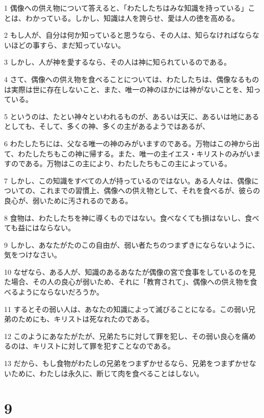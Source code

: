 \par 1 偶像への供え物について答えると、「わたしたちはみな知識を持っている」ことは、わかっている。しかし、知識は人を誇らせ、愛は人の徳を高める。
\par 2 もし人が、自分は何か知っていると思うなら、その人は、知らなければならないほどの事すら、まだ知っていない。
\par 3 しかし、人が神を愛するなら、その人は神に知られているのである。
\par 4 さて、偶像への供え物を食べることについては、わたしたちは、偶像なるものは実際は世に存在しないこと、また、唯一の神のほかには神がないことを、知っている。
\par 5 というのは、たとい神々といわれるものが、あるいは天に、あるいは地にあるとしても、そして、多くの神、多くの主があるようではあるが、
\par 6 わたしたちには、父なる唯一の神のみがいますのである。万物はこの神から出て、わたしたちもこの神に帰する。また、唯一の主イエス・キリストのみがいますのである。万物はこの主により、わたしたちもこの主によっている。
\par 7 しかし、この知識をすべての人が持っているのではない。ある人々は、偶像についての、これまでの習慣上、偶像への供え物として、それを食べるが、彼らの良心が、弱いために汚されるのである。
\par 8 食物は、わたしたちを神に導くものではない。食べなくても損はないし、食べても益にはならない。
\par 9 しかし、あなたがたのこの自由が、弱い者たちのつまずきにならないように、気をつけなさい。
\par 10 なぜなら、ある人が、知識のあるあなたが偶像の宮で食事をしているのを見た場合、その人の良心が弱いため、それに「教育されて」、偶像への供え物を食べるようにならないだろうか。
\par 11 するとその弱い人は、あなたの知識によって滅びることになる。この弱い兄弟のためにも、キリストは死なれたのである。
\par 12 このようにあなたがたが、兄弟たちに対して罪を犯し、その弱い良心を痛めるのは、キリストに対して罪を犯すことなのである。
\par 13 だから、もし食物がわたしの兄弟をつまずかせるなら、兄弟をつまずかせないために、わたしは永久に、断じて肉を食べることはしない。

\chapter{9}


